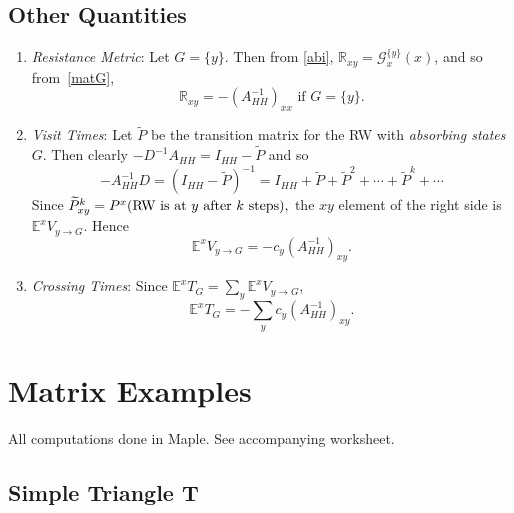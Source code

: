 \documentclass[a4paper]{amsart}
\theoremstyle{plain}
\theoremstyle{definition}
\theoremstyle{remark}
\begin{document}
\subsection{Other Quantities}
\begin{enumerate}

\item \emph{Resistance Metric}: Let $ G=\{y\} $. Then from  \eqref{abi}, $  \mathbb{R}_{xy} = \mathcal{G}_x^{\{y\}}(x) $, 
and so from~\eqref{matG},
\begin{equation} \label{eqcrm}
\boxed{ \mathbb{R}_{xy} =  -(A_{HH}^{-1})_{xx}  \text{ if } G = \{y\}.  }
\end{equation} 



\item  \emph{Visit Times}: Let $ \widetilde{P} $ be the transition matrix for the RW with \emph{absorbing states} $ G $.  Then clearly
$ 
-D^{-1}A_{HH} =   I_{HH}-\widetilde{P}  
$ 
and so 
\[
-A_{HH}^{-1} D = ( I_{HH}-\widetilde{P} )^{-1} =
I_{HH} + \widetilde{P} + \widetilde{P}^2 + \cdots + \widetilde{P}^k + \cdots   
\]
Since $ 
  \widetilde{P}^k_{xy} = P^x(\text{RW is at $ y$  after $ k $ steps}),
$ 
the $ xy $ element of the right side is $ \mathbb{E} ^xV_{y\to G} $.  Hence
\begin{equation} \label{}
\boxed{\mathbb{E} ^xV_{y\to G} = - c_y (A_{HH}^{-1})_{xy}.}
\end{equation} 

\item \emph{Crossing Times}: Since $ \mathbb{E}^x T_G = \sum_y \mathbb{E}^x V_{y\to G}$,
\begin{equation} \label{}
\boxed{ \mathbb{E}^xT_G = - \sum_y c_y (A_{HH}^{-1})_{xy}. }
\end{equation}

\end{enumerate}   



\section{\textbf{Matrix Examples}}

All computations done in Maple.  See accompanying worksheet.



\subsection{Simple Triangle   T  }
\end{document}
